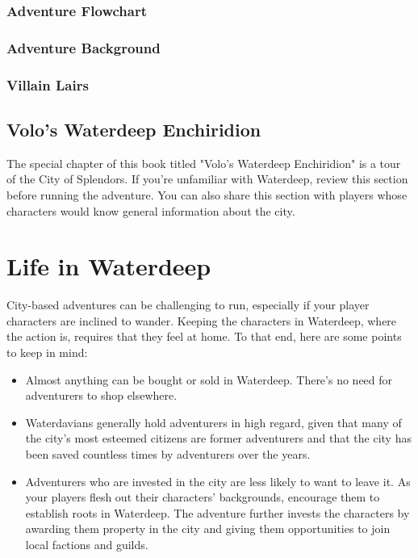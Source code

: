 \documentclass[10pt,a4paper,twoside,twocolumn,openany,nodeprecatedcode]{dndbook}
\begin{document}
\subsubsection{Adventure Flowchart}
\subsubsection{Adventure Background}
\subsubsection{Villain Lairs}
\subsection{Volo's Waterdeep Enchiridion}
The special chapter of this book titled "Volo's Waterdeep Enchiridion" is a tour of the City of Splendors. If you're unfamiliar with Waterdeep, review this section before running the adventure. You can also share this section with players whose characters would know general information about the city.
\section{Life in Waterdeep}
City-based adventures can be challenging to run, especially if your player characters are inclined to wander. Keeping the characters in Waterdeep, where the action is, requires that they feel at home. To that end, here are some points to keep in mind:
\begin{itemize}

\item Almost anything can be bought or sold in Waterdeep. There's no need for adventurers to shop elsewhere.
\item Waterdavians generally hold adventurers in high regard, given that many of the city's most esteemed citizens are former adventurers and that the city has been saved countless times by adventurers over the years.
\item Adventurers who are invested in the city are less likely to want to leave it. As your players flesh out their characters' backgrounds, encourage them to establish roots in Waterdeep. The adventure further invests the characters by awarding them property in the city and giving them opportunities to join local factions and guilds.
\end{itemize}
\end{document}
